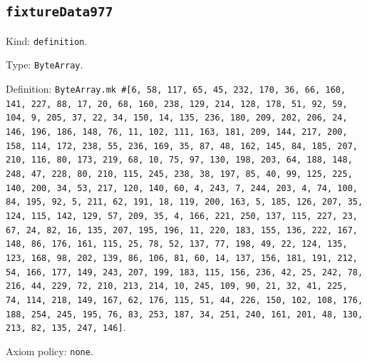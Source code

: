 \documentclass[11pt]{article}
\begin{document}
\subsection*{\texttt{fixtureData977}}
\noindent Kind: \texttt{definition}.\par
\noindent Type: \texttt{ByteArray}.\par
\noindent Definition: \texttt{ByteArray.mk \#[6, 58, 117, 65, 45, 232, 170, 36, 66, 160, 141, 227, 88, 17, 20, 68, 160, 238, 129, 214, 128, 178, 51, 92, 59, 104, 9, 205, 37, 22, 34, 150, 14, 135, 236, 180, 209, 202, 206, 24, 146, 196, 186, 148, 76, 11, 102, 111, 163, 181, 209, 144, 217, 200, 158, 114, 172, 238, 55, 236, 169, 35, 87, 48, 162, 145, 84, 185, 207, 210, 116, 80, 173, 219, 68, 10, 75, 97, 130, 198, 203, 64, 188, 148, 248, 47, 228, 80, 210, 115, 245, 238, 38, 197, 85, 40, 99, 125, 225, 140, 200, 34, 53, 217, 120, 140, 60, 4, 243, 7, 244, 203, 4, 74, 100, 84, 195, 92, 5, 211, 62, 191, 18, 119, 200, 163, 5, 185, 126, 207, 35, 124, 115, 142, 129, 57, 209, 35, 4, 166, 221, 250, 137, 115, 227, 23, 67, 24, 82, 16, 135, 207, 195, 196, 11, 220, 183, 155, 136, 222, 167, 148, 86, 176, 161, 115, 25, 78, 52, 137, 77, 198, 49, 22, 124, 135, 123, 168, 98, 202, 139, 86, 106, 81, 60, 14, 137, 156, 181, 191, 212, 54, 166, 177, 149, 243, 207, 199, 183, 115, 156, 236, 42, 25, 242, 78, 216, 44, 229, 72, 210, 213, 214, 10, 245, 109, 90, 21, 32, 41, 225, 74, 114, 218, 149, 167, 62, 176, 115, 51, 44, 226, 150, 102, 108, 176, 188, 254, 245, 195, 76, 83, 253, 187, 34, 251, 240, 161, 201, 48, 130, 213, 82, 135, 247, 146]}.\par
\noindent Axiom policy: \texttt{none}.\par
\end{document}
